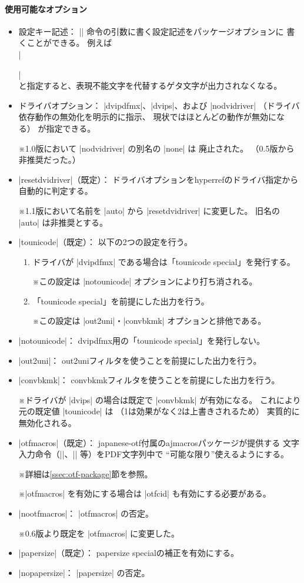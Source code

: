 \documentclass[uplatex,dvipdfmx,a4paper]{jsarticle}
\newcommand{\Pkg}[1]{\textsf{#1}}
\newcommand{\Note}{\par\noindent ※}
\newcommand{\Means}{：\quad}
\providecommand{\Strong}[1]{\textsf{#1}}
\begin{document}
\paragraph{使用可能なオプション}\mbox{}
\begin{itemize}
\item \Strong{設定キー記述}\Means
  |\pxjahypersetup| 命令の引数に書く設定記述をパッケージオプションに
  書くことができる。
  例えば\\
  |\usepackage[fallback=delete]{pxjahyper}|\\
  と指定すると、表現不能文字を代替するゲタ文字が出力されなくなる。
\item \Strong{ドライバオプション}\Means
  |dvipdfmx|、|dvips|、および |nodvidriver|%
  （ドライバ依存動作の無効化を明示的に指示、
  現状ではほとんどの動作が無効になる）
  が指定できる。
  \Note 1.0版において |nodvidriver| の別名の |none| は
    \Strong{廃止}された。
    （0.5版から非推奨だった。）
\item |resetdvidriver|（既定）\Means
  ドライバオプションを\Pkg{hyperref}のドライバ指定から自動的に判定する。
  \Note 1.1版において名前を |auto| から |resetdvidriver| に変更した。
    旧名の |auto| は\Strong{非推奨}とする。
\item |tounicode|（既定）\Means
  以下の2つの設定を行う。
  \begin{enumerate}
  \item ドライバが |dvipdfmx| である場合は「tounicode special」を発行する。
    \Note この設定は |notounicode| オプションにより打ち消される。
  \item 「tounicode special」を前提にした出力を行う。
    \Note この設定は |out2uni|・|convbkmk| オプションと排他である。
  \end{enumerate}
\item |notounicode|\Means
  dvipdfmx用の「tounicode special」を発行しない。
\item |out2uni|\Means
  out2uniフィルタを使うことを前提にした出力を行う。
\item |convbkmk|\Means
  convbkmkフィルタを使うことを前提にした出力を行う。
  \Note ドライバが |dvips| の場合は既定で |convbkmk| が有効になる。
  これにより元の既定値 |tounicode| は
  （1は効果がなく2は上書きされるため）
  実質的に無効化される。
\item |otfmacros|（既定）\Means
  \Pkg{japanese-otf}付属の\Pkg{ajmacros}パッケージが提供する
  文字入力命令（|\ajMaru|、|\ajLig| 等）をPDF文字列中で
  “可能な限り”使えるようにする。
  \Note 詳細は\ref{ssec:otf-package}節を参照。
  \Note |otfmacros| を有効にする場合は |otfcid| も有効にする必要がある。
\item |nootfmacros|\Means
  |otfmacros| の否定。
  \Note 0.6版より既定を |otfmacros| に変更した。
\item |papersize|（既定）\Means
  papersize specialの補正を有効にする。
\item |nopapersize|\Means
  |papersize| の否定。
\end{itemize}
\end{document}
